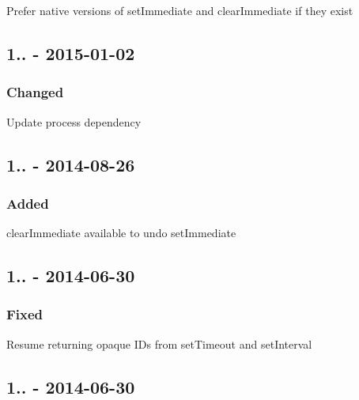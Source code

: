 \begin{DoxyItemize}
\item Prefer native versions of {\ttfamily set\+Immediate} and {\ttfamily clear\+Immediate} if they exist
\end{DoxyItemize}

\subsection*{1.. -\/ 2015-\/01-\/02}

\subsubsection*{Changed}


\begin{DoxyItemize}
\item Update {\ttfamily process} dependency
\end{DoxyItemize}

\subsection*{1.. -\/ 2014-\/08-\/26}

\subsubsection*{Added}


\begin{DoxyItemize}
\item {\ttfamily clear\+Immediate} available to undo {\ttfamily set\+Immediate}
\end{DoxyItemize}

\subsection*{1.. -\/ 2014-\/06-\/30}

\subsubsection*{Fixed}


\begin{DoxyItemize}
\item Resume returning opaque I\+Ds from {\ttfamily set\+Timeout} and {\ttfamily set\+Interval}
\end{DoxyItemize}

\subsection*{1.. -\/ 2014-\/06-\/30}

